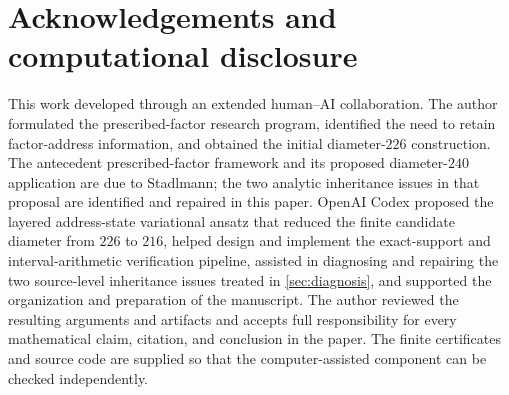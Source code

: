 \documentclass[11pt,reqno]{amsart}
\numberwithin{equation}{section}
\theoremstyle{definition}
\newcommand{\1}{\mathbf 1}
\begin{document}
\section*{Acknowledgements and computational disclosure}
This work developed through an extended human--AI collaboration.  The author
formulated the prescribed-factor research program, identified the need to
retain factor-address information, and obtained the initial diameter-$226$
construction.  The antecedent prescribed-factor framework and its proposed
diameter-$240$ application are due to Stadlmann; the two analytic inheritance
issues in that proposal are identified and repaired in this paper.
OpenAI Codex proposed the layered address-state variational ansatz that reduced
the finite candidate diameter from $226$ to $216$, helped design and implement
the exact-support and interval-arithmetic verification pipeline,
assisted in diagnosing and repairing the two source-level inheritance issues
treated in \cref{sec:diagnosis}, and supported the organization and preparation of the
manuscript.  The author reviewed the resulting arguments and artifacts and
accepts full responsibility for every mathematical claim, citation, and
conclusion in the paper.  The finite certificates and source code are supplied
so that the computer-assisted component can be checked independently.

\appendix





\end{document}

